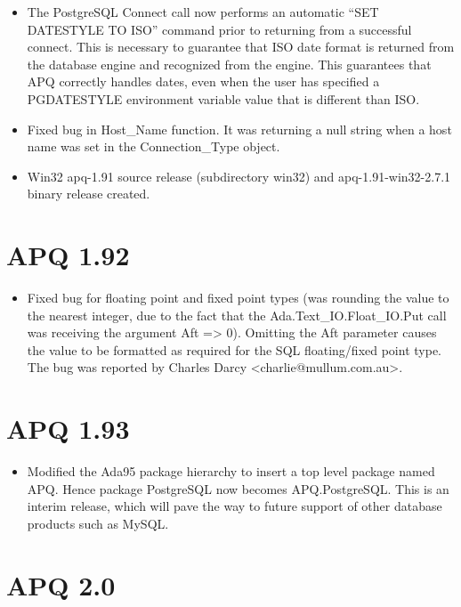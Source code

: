 \documentclass[english,letterpaper]{book}
\begin{document}
\begin{itemize}
   \item The PostgreSQL Connect call now performs an automatic {}``SET DATESTYLE
         TO ISO'' command prior to returning from a successful connect. This
         is necessary to guarantee that ISO date format is returned from the
         database engine and recognized from the engine. This guarantees that
         APQ correctly handles dates, even when the user has specified a PGDATESTYLE
         environment variable value that is different than ISO.
         \item Fixed bug in Host\_Name function. It was returning a null string when
         a host name was set in the Connection\_Type object.
   \item Win32 apq-1.91 source release (subdirectory win32) and apq-1.91-win32-2.7.1
         binary release created.
\end{itemize}

\section*{APQ 1.92}

\begin{itemize}
   \item Fixed bug for floating point and fixed point types (was rounding the
         value to the nearest integer, due to the fact that the Ada.Text\_IO.Float\_IO.Put
         call was receiving the argument Aft => 0). Omitting the Aft parameter
         causes the value to be formatted as required for the SQL floating/fixed
         point type. The bug was reported by Charles Darcy <charlie@mullum.com.au>.
\end{itemize}

\section*{APQ 1.93}

\begin{itemize}
   \item Modified the Ada95 package hierarchy to insert a top level package
         named APQ. Hence package PostgreSQL now becomes APQ.PostgreSQL. This
         is an interim release, which will pave the way to future support of
         other database products such as MySQL.
\end{itemize}

\section*{APQ 2.0}
\end{document}
